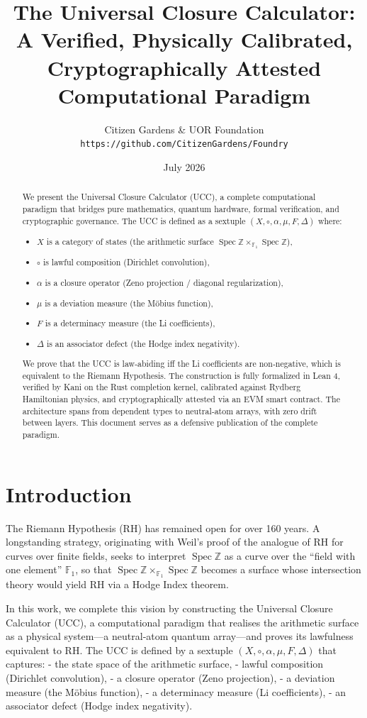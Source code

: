 \documentclass[11pt]{article}
\title{The Universal Closure Calculator: A Verified, Physically Calibrated, Cryptographically Attested Computational Paradigm}
\author{Citizen Gardens \& UOR Foundation \\ \texttt{https://github.com/CitizenGardens/Foundry}}
\date{July 2026}
\newcommand{\F}{\mathbb{F}}
\newcommand{\Z}{\mathbb{Z}}
\newcommand{\Spec}{\operatorname{Spec}}
\begin{document}
\maketitle

\begin{abstract}
We present the Universal Closure Calculator (UCC), a complete computational paradigm that bridges pure mathematics, quantum hardware, formal verification, and cryptographic governance. The UCC is defined as a sextuple \((X,\circ,\alpha,\mu,F,\Delta)\) where:
\begin{itemize}
\item \(X\) is a category of states (the arithmetic surface \(\Spec\Z\times_{\F_1}\Spec\Z\)),
\item \(\circ\) is lawful composition (Dirichlet convolution),
\item \(\alpha\) is a closure operator (Zeno projection / diagonal regularization),
\item \(\mu\) is a deviation measure (the Möbius function),
\item \(F\) is a determinacy measure (the Li coefficients),
\item \(\Delta\) is an associator defect (the Hodge index negativity).
\end{itemize}
We prove that the UCC is law‐abiding iff the Li coefficients are non‐negative, which is equivalent to the Riemann Hypothesis. The construction is fully formalized in Lean 4, verified by Kani on the Rust completion kernel, calibrated against Rydberg Hamiltonian physics, and cryptographically attested via an EVM smart contract. The architecture spans from dependent types to neutral‐atom arrays, with zero drift between layers. This document serves as a defensive publication of the complete paradigm.
\end{abstract}
\newpage
\tableofcontents
\newpage
\section{Introduction}

The Riemann Hypothesis (RH) has remained open for over 160 years. A longstanding strategy, originating with Weil's proof of the analogue of RH for curves over finite fields, seeks to interpret \(\Spec\Z\) as a curve over the “field with one element” \(\F_1\), so that \(\Spec\Z\times_{\F_1}\Spec\Z\) becomes a surface whose intersection theory would yield RH via a Hodge Index theorem.

In this work, we complete this vision by constructing the Universal Closure Calculator (UCC), a computational paradigm that realises the arithmetic surface as a physical system—a neutral‐atom quantum array—and proves its lawfulness equivalent to RH. The UCC is defined by a sextuple \((X,\circ,\alpha,\mu,F,\Delta)\) that captures:
- the state space of the arithmetic surface,
- lawful composition (Dirichlet convolution),
- a closure operator (Zeno projection),
- a deviation measure (the Möbius function),
- a determinacy measure (Li coefficients),
- an associator defect (Hodge index negativity).
\end{document}
